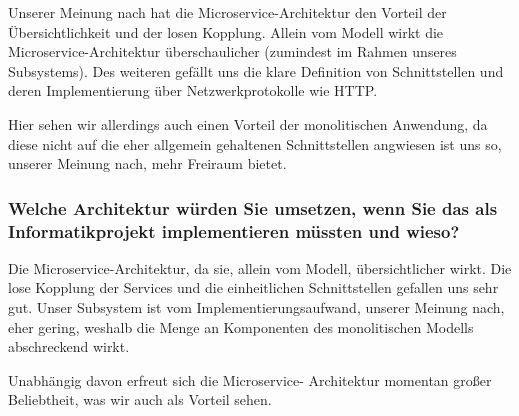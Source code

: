 Unserer Meinung nach hat die Microservice-Architektur den
Vorteil der \"Ubersichtlichkeit und der losen Kopplung.
Allein vom Modell wirkt die Microservice-Architektur
\"uberschaulicher (zumindest im Rahmen unseres Subsystems).
Des weiteren gef\"allt uns die klare Definition von
Schnittstellen und deren Implementierung \"uber
Netzwerkprotokolle wie HTTP.

Hier sehen wir allerdings auch einen Vorteil der
monolitischen Anwendung, da diese nicht auf die eher
allgemein gehaltenen Schnittstellen angwiesen ist uns so,
unserer Meinung nach, mehr Freiraum bietet.

\subsubsection*{Welche Architektur w\"urden Sie umsetzen,
  wenn Sie das als Informatikprojekt implementieren
  m\"ussten und wieso?}

Die Microservice-Architektur, da sie, allein vom Modell,
\"ubersichtlicher wirkt. Die lose Kopplung der Services und
die einheitlichen Schnittstellen gefallen uns sehr gut.
Unser Subsystem ist vom Implementierungsaufwand, unserer
Meinung nach, eher gering, weshalb die Menge an Komponenten
des monolitischen Modells abschreckend wirkt.

Unabh\"angig davon erfreut sich die Microservice-
Architektur momentan gro{\ss}er Beliebtheit, was wir auch
als Vorteil sehen.
